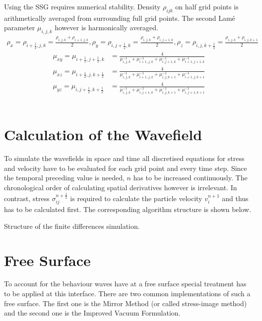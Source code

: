 \documentclass[pdftex,a4paper,parskip,listof=totoc,bibliography=totoc,onehalfspacing,12pt]{scrreprt}
\begin{document}
Using the SSG requires numerical stability. Density $\rho_{ijk}$ on half grid points is arithmetically averaged from surrounding full grid points. The second Lam\'{e} parameter $\mu_{i,j,k}$ however is harmonically averaged. 
\begin{align*}
	\rho_x=\rho_{i+\frac{1}{2},j,k} = \frac{\rho_{i,j,k} + \rho_{i+1,j,k}}{2}, \rho_y=\rho_{i,j+\frac{1}{2},k} = \frac{\rho_{i,j,k} + \rho_{i,j+1,k}}{2}, \rho_z=\rho_{i,j,k+\frac{1}{2}} = \frac{\rho_{i,j,k} + \rho_{i,j,k+1}}{2}
\end{align*}
\begin{align*}
	\mu_{xy}=\mu_{i+\frac{1}{2},j+\frac{1}{2},k} &= \frac{4}{\mu^{-1}_{i,j,k} + \mu^{-1}_{i+1,j,k} + \mu^{-1}_{i,j+1,k} + \mu^{-1}_{i+1,j+1,k}}\\
	\mu_{xz}=\mu_{i+\frac{1}{2},j,k+\frac{1}{2}} &= \frac{4}{\mu^{-1}_{i,j,k} + \mu^{-1}_{i+1,j,k} + \mu^{-1}_{i,j,k+1} + \mu^{-1}_{i+1,j,k+1}}\\
	\mu_{yz}=\mu_{i,j+\frac{1}{2},k+\frac{1}{2}} &= \frac{4}{\mu^{-1}_{i,j,k} + \mu^{-1}_{i,j+1,k} + \mu^{-1}_{i,j,k+1} + \mu^{-1}_{i,j+1,k+1}}
\end{align*}
\\

\section{Calculation of the Wavefield}
To simulate the wavefields in space and time all discretised equations for stress and velocity have to be evaluated for each grid point and every time step. Since the temporal preceding value is needed, $n$ has to be increased continuously. The chronological order of calculating spatial derivatives however is irrelevant. In contrast, stress $\sigma_{ij}^{n+\frac{1}{2}}$ is required to calculate the particle velocity $v_i^{n+1}$ and thus has to be calculated first. The corresponding algorithm structure is shown below. 
\begin{algorithm}
\caption{Structure of the finite differences simulation.}
\label{alg:FD}
\end{algorithm}

\section{Free Surface}
\label{sec:FreeSurface}
To account for the behaviour waves have at a free surface special treatment has to be applied at this interface. There are two common implementations of such a free surface. The first one is the Mirror Method (or called stress-image method) and the second one is the Improved Vacuum Formulation.
\end{document}

